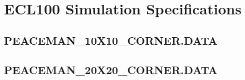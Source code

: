 
\section{ECL100 Simulation Specifications} %
\label{sec:ecl100_simulation_specifications}

\subsection{PEACEMAN\_10X10\_CORNER.DATA} %
\label{sub:peaceman_10x10_data}
{\footnotesize%
}
\clearpage

\subsection{PEACEMAN\_20X20\_CORNER.DATA} %
\label{sub:peaceman_20x20_data}
{\footnotesize%
}
\clearpage

